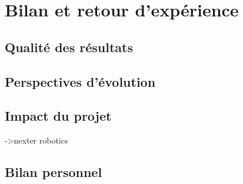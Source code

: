 \chapter{Bilan et retour d'expérience}

	\section{Qualité des résultats}
	

	\section{Perspectives d'évolution}
	

	\section{Impact du projet}
		
		->nexter robotics
	
	\section{Bilan personnel}
	

